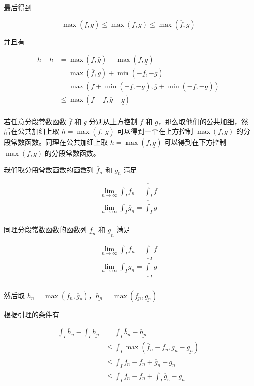 最后得到

\[
\max(\underline{f},\underline{g})\le  \max(f, g) \le \max(\overline{f}, \overline{g})
\]

并且有

\begin{align*}
  \overline{h} - \underline{h} & = \max(\overline{f}, \overline{g}) - \max(\underline{f}, \underline{g}) \\
    & = \max(\overline{f}, \overline{g}) + \min(-\underline{f}, -\underline{g}) \\
    & = \max(\overline{f} + \min(-\underline{f}, -\underline{g}), \overline{g} + \min(-\underline{f}, -\underline{g})) \\
    & \le \max(\overline{f} -\underline{f}, \overline{g} -\underline{g}) \\
\end{align*}

若任意分段常数函数 $\overline{f}$ 和 $\overline{g}$ 分别从上方控制 $f$ 和 $g$，那么取他们的公共加细，然后在公共加细上取 $\overline{h} = \max(\overline{f},\, \overline{g})$
可以得到一个在上方控制 $\max(f,g)$ 的分段常数函数。同理在公共加细上取 $\underline{h} = \max(\underline{f}, \underline{g})$
可以得到在下方控制 $\max(f,g)$ 的分段常数函数。

我们取分段常数函数的函数列 $\overline{f}_n$ 和 $\overline{g}_n$ 满足

\begin{align*}
    \lim_{n \to \infty}\int_{I}\overline{f}_n = \overline{\int}_{I}f \\
    \lim_{n \to \infty}\int_{I}\overline{g}_n = \overline{\int}_{I}g \\
\end{align*}


同理分段常数函数的函数列 $\underline{f}_n$ 和 $\underline{g}_n$ 满足

\begin{align*}
    \lim_{n \to \infty}\int_{I}\underline{f_n} = \underline{\int}_{I}f \\
    \lim_{n \to \infty}\int_{I}\underline{g_n} = \underline{\int}_{I}g \\
\end{align*}

然后取 $\overline{h_n} = \max(\overline{f}_n, \overline{g}_n)$，$\underline{h_n} = \max(\underline{f_n}, \underline{g_n})$

根据引理的条件有

\begin{align*}
\int_{I}\overline{h}_n - \int_{I}\underline{h_n} & = \int_{I}\overline{h}_n - \underline{h_n} \\
& \le \int_{I} \max(\overline{f}_n -\underline{f_n}, \overline{g}_n -\underline{g_n}) \\
& \le \int_{I} \overline{f}_n -\underline{f_n} + \overline{g}_n - \underline{g_n} \\ 
&\le \int_{I} \overline{f}_n -\underline{f_n} + \int_{I} \overline{g}_n -\underline{g_n}
\end{align*}


